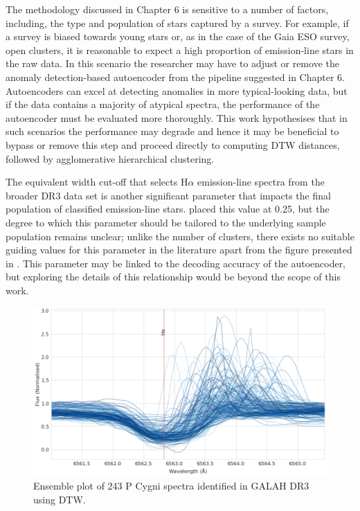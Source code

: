 The methodology discussed in Chapter 6 is sensitive to a number of factors, including, the type and population of stars captured by a survey. For example, if a survey is biased towards young stars or, as in the case of the Gaia ESO survey, open clusters, it is reasonable to expect a high proportion of emission-line stars in the raw data. In this scenario the researcher may have to adjust or remove the anomaly detection-based autoencoder from the pipeline suggested in Chapter 6. Autoencoders can excel at detecting anomalies in more typical-looking data, but if the data contains a majority of atypical spectra, the performance of the autoencoder must be evaluated more thoroughly. This work hypothesises that in such scenarios the performance may degrade and hence it may be beneficial to bypass or remove this step and proceed directly to computing DTW distances, followed by agglomerative hierarchical clustering. 

The equivalent width cut-off that selects H$\alpha$ emission-line spectra from the broader DR3 data set is another significant parameter that impacts the final population of classified emission-line stars. \citet{vcotar2021galah} placed this value at 0.25, but the degree to which this parameter should be tailored to the underlying sample population remains unclear; unlike the number of clusters, there exists no suitable guiding values for this parameter in the literature apart from the figure presented in \citet{vcotar2021galah}. This parameter may be linked to the decoding accuracy of the autoencoder, but exploring the details of this relationship would be beyond the scope of this work.

\begin{figure}[!htb]
\centering
\includegraphics[scale=0.45]{figures/p cygni ensemble.png}
\caption{Ensemble plot of 243 P Cygni spectra identified in GALAH DR3 using DTW.}
\end{figure}

